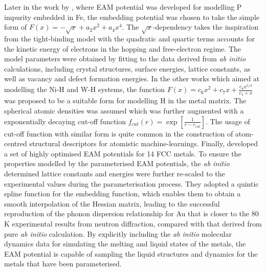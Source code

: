 Later in the work by \citet{ackland2004development}, where EAM potential was developed for modelling P impurity embedded in Fe, the embedding potential was chosen to take the simple form of $F(x)=-\sqrt{x}+a_2 x^2+a_4 x^4$. The $\sqrt{x}$-dependency takes the inspiration from the tight-binding model\cite{finnis1984simple} with the quadratic and quartic terms accounts for the kinetic energy of electrons in the hopping and free-electron regime. The model parameters were obtained by fitting to the data derived from \emph{ab initio} calculations, including crystal structures, surface energies, lattice constants, as well as vacancy and defect formation energies. In the other works which aimed at modelling the Ni-H\cite{angelo1995trapping,baskes1997trapping} and W-H\cite{wang2017embedded} systems, the function $F(x)=c_6 x^2+c_7 x+\frac{c_8 x^{5/3}}{c_4+x}$ was proposed to be a suitable form for modelling H in the metal matrix. The spherical atomic densities was assumed which was further augmented with a exponentially decaying cut-off function $f_{cut}(r)=\exp\left[\frac{1}{r-r_{cut}}\right]$. The usage of cut-off function with similar form is quite common in the construction of atom-centred structural descriptors\cite{bartok2013representing,behler2011neural} for atomistic machine-learnings. Finally, \citet{sheng2011highly} developed a set of highly optimised EAM potentials for 14 FCC metals. To ensure the properties modelled by the parameterised EAM potentials, the \emph{ab initio} determined lattice constants and energies were further re-scaled to the experimental values during the parameterisation process. They adopted a quintic spline function for the embedding function, which enables them to obtain a smooth interpolation of the Hessian matrix, leading to the successful reproduction of the phonon dispersion relationship for Au that is closer to the 80 K experimental results from neutron diffraction, compared with that derived from pure \emph{ab initio} calculation.  By explicitly including the \emph{ab initio} molecular dynamics data for simulating the melting and liquid states of the metals, the EAM potential is capable of sampling the liquid structures and dynamics for the metals that have been parameterised. 

